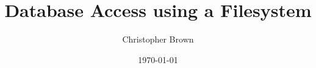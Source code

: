 \documentclass[12pt,twoside,abbrevs,bsc,logo,notimes,deptreport]{styles/infthesis}
\title{Database Access using a Filesystem}
\author{Christopher Brown}
\date{\today}
\begin{document}
  \begin{preliminary}
    \maketitle

    
    \standarddeclaration
    \tableofcontents
    \listoffigures
  \end{preliminary}

  
  
  
  
  
  
  

  \appendix

  

  {}
  
\end{document}
